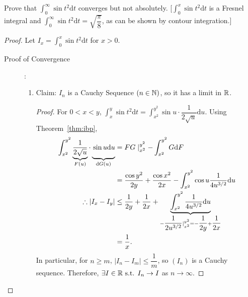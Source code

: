 \begin{example}[1]
	Prove that $\int_{0}^{\infty}{\sin{t^2}\mathrm{d}t}$ converges but not absolutely.
	[$\int_{0}^{x}{\sin{t^2}\mathrm{d}t}$ is a Fresnel integral and $\int_{0}^{\infty}{\sin{t^2}\mathrm{d}t}= \sqrt{\dfrac{\pi}{8}}$, as can be shown by contour integration.]
	\begin{proof}
		Let $I_x=\int_{0}^{x}{\sin{t^2}\mathrm{d}t}$ for $x>0$.
		\begin{description}
			\item[Proof of Convergence]:
			      \begin{enumerate}
				      \item
				            Claim: $I_n$ is a Cauchy Sequence $(n \in \mathbb{N})$, so it has a limit in $\mathbb{R}$.
				            \begin{proof}
					            For $0<x<y$, $\int_{x}^{y}{\sin{t^2}\mathrm{d}t}=\int_{x^2}^{y^2}{\sin{u} \cdot \dfrac{1}{2 \sqrt{u}}\mathrm{d}u}$.
					            Using Theorem~\ref{thm:ibp},
					            \begin{align*}
						            \int_{x^2}^{y^2}{\underbrace{\dfrac{1}{2 \sqrt{u}}}_{F(u)}\cdot  \underbrace{\vphantom{\dfrac{1}{2 \sqrt{u}}}\sin{u}\mathrm{d}u}_{\mathclap{\mathrm{d}G(u)}}} & =FG \mid_{x^2}^{y^2}- \int_{x^2}^{y^2}{G\mathrm{d}F}                                                                                                               \\
						                                                                                                                                                                          & =\dfrac{\cos{y^2}}{2y}+\dfrac{\cos{x^2}}{2x}-\int_{x^2}^{y^2}{\cos{u}\dfrac{1}{4u^{3/2}}\mathrm{d}u}                                                               \\
						            \therefore \left|I_x-I_y\right|                                                                                                                               & \le \dfrac{1}{2y}+\dfrac{1}{2x}+\underbrace{\int_{x^2}^{y^2}{\dfrac{1}{4u^{3/2}}\mathrm{d}u}}_{-\dfrac{1}{2u^{3/2}} \mid_{x^2}^{y^2}=-\dfrac{1}{2y}+\dfrac{1}{2x}} \\
						                                                                                                                                                                          & =\dfrac{1}{x}
						            .\end{align*}
					            In particular, for $n\ge m$, $\left|I_n-I_m\right|\le \dfrac{1}{m}$, so $(I_n)$ is a Cauchy sequence.
					            Therefore, $\exists{ I \in \ensuremath{\mathbb{R}}} \text{ s.t. } I_n\to I$ as $n\to \infty$.
				            \end{proof}


\end{enumerate}
\end{description}
\end{proof}
\end{example}
